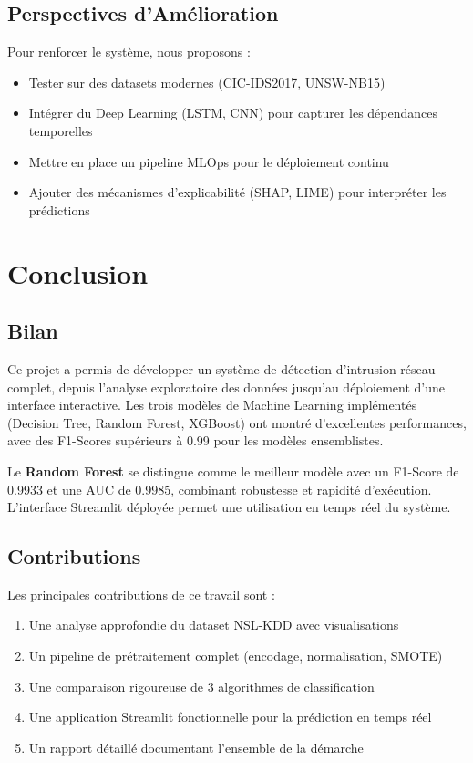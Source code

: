 \documentclass[12pt,a4paper]{article}
\begin{document}
\subsection{Perspectives d'Amélioration}

Pour renforcer le système, nous proposons :
\begin{itemize}
    \item Tester sur des datasets modernes (CIC-IDS2017, UNSW-NB15)
    \item Intégrer du Deep Learning (LSTM, CNN) pour capturer les dépendances temporelles
    \item Mettre en place un pipeline MLOps pour le déploiement continu
    \item Ajouter des mécanismes d'explicabilité (SHAP, LIME) pour interpréter les prédictions
\end{itemize}

\section{Conclusion}

\subsection{Bilan}

Ce projet a permis de développer un système de détection d'intrusion réseau complet, depuis l'analyse exploratoire des données jusqu'au déploiement d'une interface interactive. Les trois modèles de Machine Learning implémentés (Decision Tree, Random Forest, XGBoost) ont montré d'excellentes performances, avec des F1-Scores supérieurs à 0.99 pour les modèles ensemblistes.

Le \textbf{Random Forest} se distingue comme le meilleur modèle avec un F1-Score de 0.9933 et une AUC de 0.9985, combinant robustesse et rapidité d'exécution. L'interface Streamlit déployée permet une utilisation en temps réel du système.

\subsection{Contributions}

Les principales contributions de ce travail sont :
\begin{enumerate}
    \item Une analyse approfondie du dataset NSL-KDD avec visualisations
    \item Un pipeline de prétraitement complet (encodage, normalisation, SMOTE)
    \item Une comparaison rigoureuse de 3 algorithmes de classification
    \item Une application Streamlit fonctionnelle pour la prédiction en temps réel
    \item Un rapport détaillé documentant l'ensemble de la démarche
\end{enumerate}
\end{document}
